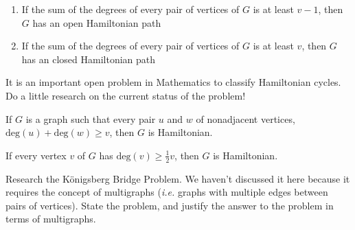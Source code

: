 \begin{theorem}\leavevmode
\begin{enumerate}
    \item If the sum of the degrees of every pair of vertices of $G$ is at least $v-1$, then $G$ has an open Hamiltonian path
    \item If the sum of the degrees of every pair of vertices of $G$ is at least $v$, then $G$ has an closed Hamiltonian path
\end{enumerate}
\end{theorem}

\begin{exercise} It is an important open problem in Mathematics to classify Hamiltonian cycles.  Do a little research on the current status of the problem!
\end{exercise}

\begin{theorem} If $G$ is a graph such that every pair $u$ and $w$ of nonadjacent vertices, $\text{deg}(u) + \text{deg}(w) \geq v$, then $G$ is Hamiltonian.
\end{theorem}

\begin{theorem}[Dirac] If every vertex $v$ of $G$ has $\text{deg}(v) \geq \frac{1}{2}v$, then $G$ is Hamiltonian.
\end{theorem}

\begin{remark} Research the K\"{o}nigsberg Bridge Problem.  We haven't discussed it here because it requires the concept of multigraphs (\textit{i.e.} graphs with multiple edges between pairs of vertices).  State the problem, and justify the answer to the problem in terms of multigraphs.
\end{remark}

